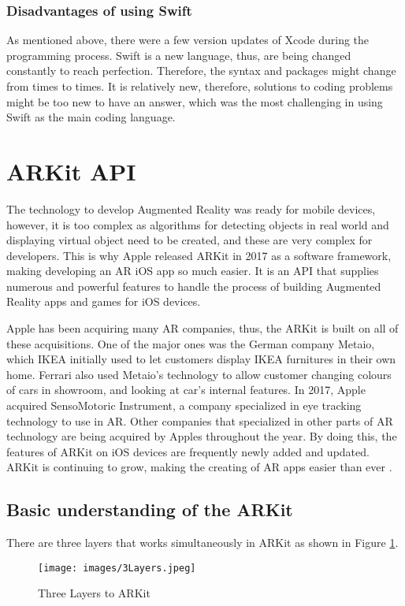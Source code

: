 	\subsubsection{Disadvantages of using Swift}
As mentioned above, there were a few version updates of Xcode during the programming process. Swift is a new language, thus, are being changed constantly to reach perfection. Therefore, the syntax and packages might change from times to times. It is relatively new, therefore, solutions to coding problems might be too new to have an answer, which was the most challenging in using Swift as the main coding language. 

\section{ARKit API}
The technology to develop Augmented Reality was ready for mobile devices, however, it is too complex as algorithms for detecting objects in real world and displaying virtual object need to be created, and these are very complex for developers. This is why Apple released ARKit in 2017 as a software framework, making developing an AR iOS app so much easier. It is an API that supplies numerous and powerful features to handle the process of building Augmented Reality apps and games for iOS devices. 

Apple has been acquiring many AR companies, thus, the ARKit is built on all of these acquisitions. One of the major ones was the German company Metaio, which IKEA initially used to let customers display IKEA furnitures in their own home. Ferrari also used Metaio’s technology to allow customer changing colours of cars in showroom, and looking at car’s internal features. In 2017, Apple acquired SensoMotoric Instrument, a company specialized in eye tracking technology to use in AR. Other companies that specialized in other parts of AR technology are being acquired by Apples throughout the year. By doing this, the features of ARKit on iOS devices are frequently newly added and updated. ARKit is continuing to grow, making the creating of AR apps easier than ever \parencite{wang_beginning_2018}.

\subsection{Basic understanding of the ARKit}
There are three layers that works simultaneously in ARKit \parencite{noauthor_introduction_nodate-1} as shown in Figure \ref{fig:3Layers}.
\begin{figure}[!htp]
	\centering
	\texttt{[image: images/3Layers.jpeg]}
	\caption{Three Layers to ARKit}
	\label{fig:3Layers}
\end{figure}

